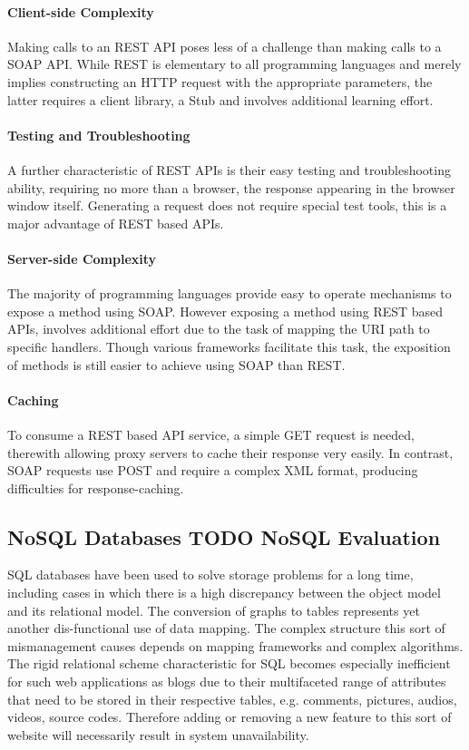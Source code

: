 \paragraph{Client-side Complexity}

Making calls to an REST API poses less of a challenge than making calls to a SOAP API. While REST is elementary to all programming languages and merely implies constructing an HTTP request with the appropriate parameters, the latter requires a client library, a Stub and involves additional learning effort.  

\paragraph{Testing and Troubleshooting}

A further characteristic of REST APIs is their easy testing and troubleshooting ability, requiring no more than a browser, the response appearing in the browser window itself. Generating a request does not require special test tools, this is a major advantage of REST based APIs.  
  

\paragraph{Server-side Complexity}

The majority of programming languages provide easy to operate mechanisms to expose a method using SOAP. However exposing a method using REST based APIs, involves additional effort due to the task of mapping the URI path to specific handlers. Though various frameworks facilitate this task, the exposition of methods is still easier to achieve using SOAP than REST.

\paragraph{Caching}

To consume a REST based API service, a simple GET request is needed, therewith allowing proxy servers to cache their response very easily. In contrast, SOAP requests use POST and require a complex XML format, producing difficulties for response-caching.

\subsection{NoSQL Databases TODO NoSQL Evaluation\label{sec:back_da_per}}
SQL databases have been used to solve storage problems for a long time, including cases in which there is a high discrepancy between the object model and its relational model. The conversion of graphs to tables represents yet another dis-functional use of data mapping. The complex structure this sort of mismanagement causes depends on mapping frameworks and complex algorithms. The rigid relational scheme characteristic for SQL becomes especially inefficient for such web applications as blogs due to their multifaceted range of attributes that need to be stored in their respective tables, e.g. comments, pictures, audios, videos, source codes. Therefore adding or removing a new feature to this sort of website will necessarily result in system unavailability.          

